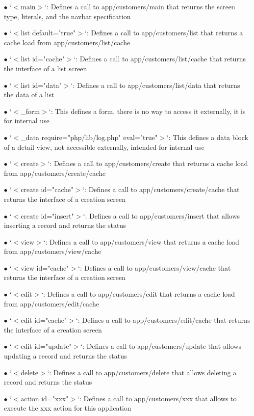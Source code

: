 \documentclass[a4paper]{article}
\begin{document}
\begin{compactitem}
\item[\color{myblue}$\bullet$] `$<$main$>$`: Defines a call to app/customers/main that returns the screen type, literals, and the navbar specification
\item[\color{myblue}$\bullet$] `$<$list default="true"$>$`: Defines a call to app/customers/list that returns a cache load from app/customers/list/cache
\item[\color{myblue}$\bullet$] `$<$list id="cache"$>$`: Defines a call to app/customers/list/cache that returns the interface of a list screen
\item[\color{myblue}$\bullet$] `$<$list id="data"$>$`: Defines a call to app/customers/list/data that returns the data of a list
\item[\color{myblue}$\bullet$] `$<$\_form$>$`: This defines a form, there is no way to access it externally, it is for internal use
\item[\color{myblue}$\bullet$] `$<$\_data require="php/lib/log.php" eval="true"$>$`: This defines a data block of a detail view, not accessible externally, intended for internal use
\item[\color{myblue}$\bullet$] `$<$create$>$`: Defines a call to app/customers/create that returns a cache load from app/customers/create/cache
\item[\color{myblue}$\bullet$] `$<$create id="cache"$>$`: Defines a call to app/customers/create/cache that returns the interface of a creation screen
\item[\color{myblue}$\bullet$] `$<$create id="insert"$>$`: Defines a call to app/customers/insert that allows inserting a record and returns the status
\item[\color{myblue}$\bullet$] `$<$view$>$`: Defines a call to app/customers/view that returns a cache load from app/customers/view/cache
\item[\color{myblue}$\bullet$] `$<$view id="cache"$>$`: Defines a call to app/customers/view/cache that returns the interface of a creation screen
\item[\color{myblue}$\bullet$] `$<$edit$>$`: Defines a call to app/customers/edit that returns a cache load from app/customers/edit/cache
\item[\color{myblue}$\bullet$] `$<$edit id="cache"$>$`: Defines a call to app/customers/edit/cache that returns the interface of a creation screen
\item[\color{myblue}$\bullet$] `$<$edit id="update"$>$`: Defines a call to app/customers/update that allows updating a record and returns the status
\item[\color{myblue}$\bullet$] `$<$delete$>$`: Defines a call to app/customers/delete that allows deleting a record and returns the status
\item[\color{myblue}$\bullet$] `$<$action id="xxx"$>$`: Defines a call to app/customers/xxx that allows to execute the xxx action for this application
\end{compactitem}
\end{document}
